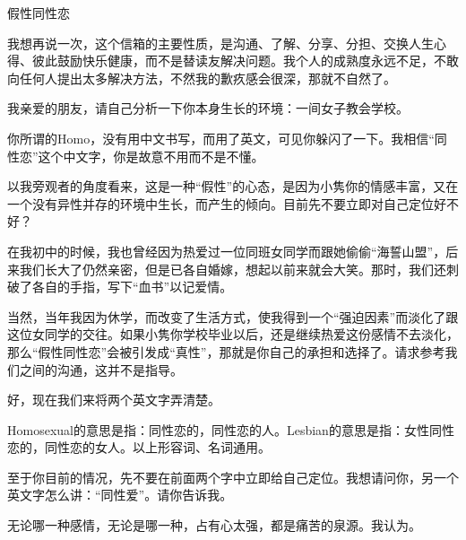 \begin{center}
    \par 假性同性恋 
\end{center}
\par {}
\par 我想再说一次，这个信箱的主要性质，是沟通、了解、分享、分担、交换人生心得、彼此鼓励快乐健康，而不是替读友解决问题。我个人的成熟度永远不足，不敢向任何人提出太多解决方法，不然我的歉疚感会很深，那就不自然了。
\par 我亲爱的朋友，请自己分析一下你本身生长的环境：一间女子教会学校。
\par 你所谓的Homo，没有用中文书写，而用了英文，可见你躲闪了一下。我相信“同性恋”这个中文字，你是故意不用而不是不懂。
\par 以我旁观者的角度看来，这是一种“假性”的心态，是因为小隽你的情感丰富，又在一个没有异性并存的环境中生长，而产生的倾向。目前先不要立即对自己定位好不好？
\par 在我初中的时候，我也曾经因为热爱过一位同班女同学而跟她偷偷“海誓山盟”，后来我们长大了仍然亲密，但是已各自婚嫁，想起以前来就会大笑。那时，我们还刺破了各自的手指，写下“血书”以记爱情。
\par 当然，当年我因为休学，而改变了生活方式，使我得到一个“强迫因素”而淡化了跟这位女同学的交往。如果小隽你学校毕业以后，还是继续热爱这份感情不去淡化，那么“假性同性恋”会被引发成“真性”，那就是你自己的承担和选择了。请求参考我们之间的沟通，这并不是指导。
\par 好，现在我们来将两个英文字弄清楚。
\par Homosexual的意思是指：同性恋的，同性恋的人。Lesbian的意思是指：女性同性恋的，同性恋的女人。以上形容词、名词通用。
\par 至于你目前的情况，先不要在前面两个字中立即给自己定位。我想请问你，另一个英文字怎么讲：“同性爱”。请你告诉我。
\par 无论哪一种感情，无论是哪一种，占有心太强，都是痛苦的泉源。我认为。
\par {}




